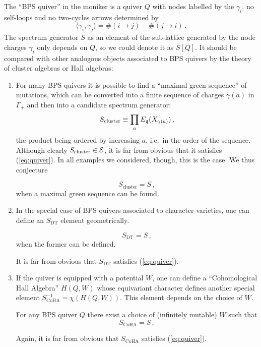 \documentclass[12pt]{amsart}
\begin{document}
The ``BPS quiver'' in the moniker is a quiver $Q$ with nodes labelled by the $\gamma_i$, no self-loops and no two-cycles
arrows determined by 
\begin{equation}
	\langle \gamma_i,\gamma_j\rangle = \#(i \to j) - \#(j \to i) \, .
\end{equation}
The spectrum generator $S$ as an element of the sub-lattice generated by the node charges $\gamma_i$  only depends on $Q$, 
so we could denote it as $S[Q]$. It should be compared with other analogous objects associated to BPS quivers by the theory of cluster algebras or 
Hall algebras:
\begin{enumerate}
	\item For many BPS quivers it is possible to find a ``maximal green
	sequence'' of mutations, which can be converted into a finite sequence
	of charges $\gamma(a)$ in $\Gamma_+$ and then into a candidate
	spectrum generator:
		\begin{equation}
			S_{\mathrm{cluster}} \equiv \prod_a E_{\mathfrak{q}}(X_{\gamma(a)}) \, ,
		\end{equation}
		the product being ordered by increasing $a$, i.e.\ in the order of the sequence.
	Although clearly $S_{\mathrm{cluster}} \in \mathcal{E}$, it is far from obvious that it satisfies (\ref{eq:quiver}).
	In all examples we considered, though, this is the case. We thus conjecture
	\begin{conjecture}[$S_{\mathrm{cluster}}=S$]\label{conj:cluster}
	\begin{equation}	
		S_{\mathrm{cluster}} = S \, ,
	\end{equation}
	when a maximal green sequence can be found. 
	\end{conjecture}
	\item In the special case of BPS quivers associated to character varieties, one can define an 
	$S_{\mathrm{DT}}$ element geometrically. 
	\begin{conjecture}[$S_{\mathrm{DT}}=S$]\label{conj:dt}
	\begin{equation}	
		S_{\mathrm{DT}} = S \, ,
	\end{equation}
	when the former can be defined. 
	\end{conjecture}
	It is far from obvious that $S_{\mathrm{DT}}$ satisfies (\ref{eq:quiver}).
	\item If the quiver is equipped with a potential $W$, one can define a ``Cohomological Hall Algebra'' $H(Q,W)$ whose equivariant character 
	defines another special element $S^{-1}_{\mathrm{CoHA}} = \chi(H(Q,W))$. This element depends on the choice of $W$. 
	\begin{conjecture}[$S_{\mathrm{CoHA}}=S$]\label{conj:coha}
	For any BPS quiver $Q$ there exist a choice of (infinitely mutable) $W$ such that 
	\begin{equation}	
		S_{\mathrm{CoHA}}= S \, ,
	\end{equation}
	\end{conjecture}
	Again, it is far from obvious that $S_{\mathrm{CoHA}}$ satisfies (\ref{eq:quiver}).
\end{enumerate}
\end{document}
